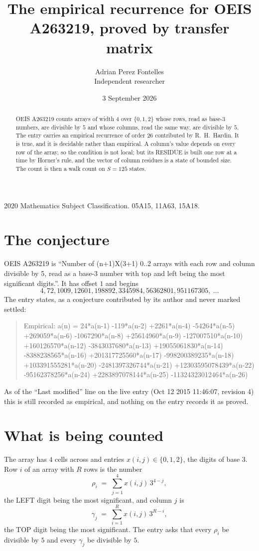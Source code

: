 \documentclass[11pt,a4paper]{article}
\title{The empirical recurrence for OEIS A263219, proved by transfer matrix}
\author{Adrian Perez Fontelles\\ \small Independent researcher}
\date{3 September 2026}
\theoremstyle{plain}
\theoremstyle{definition}
\begin{document}
\maketitle

\begin{abstract}
OEIS A263219 counts arrays of width $4$ over $\{0,1,2\}$ whose rows, read as base-$3$
numbers, are divisible by $5$ and whose columns, read the same way, are divisible by
$5$. The entry carries an empirical recurrence of order $26$ contributed by
R.~H.~Hardin. It is true, and it is decidable rather than empirical. A column's value depends on
every row of the array, so the condition is not local; but its RESIDUE is built one row at a
time by Horner's rule, and the vector of column residues is a state of bounded size. The count
is then a walk count on $S=125$ states.
\end{abstract}

\noindent\small 2020 Mathematics Subject Classification. 05A15, 11A63, 15A18.\normalsize

\section{The conjecture}

OEIS A263219 is ``Number of (n+1)X(3+1) 0..2 arrays with each row and column divisible by 5, read as a base-3 number with top and left being the most significant digits.''. It has offset $1$ and begins
\[
4, 72, 1009, 12601, 198892, 3345984, 56362801, 951167305,\ \dots
\]
The entry states, as a conjecture contributed by its author and never marked settled:
\begin{quote}
Empirical: a(n) = 24*a(n-1) -119*a(n-2) +2261*a(n-4) -54264*a(n-5) +269059*a(n-6) -1067290*a(n-8) +25614960*a(n-9) -127007510*a(n-10) +160126570*a(n-12) -3843037680*a(n-13) +19055061830*a(n-14) -8388238565*a(n-16) +201317725560*a(n-17) -998200389235*a(n-18) +103391555281*a(n-20) -2481397326744*a(n-21) +12303595078439*a(n-22) -95162378256*a(n-24) +2283897078144*a(n-25) -11324323012464*a(n-26)
\end{quote}
As of the ``Last modified'' line on the live entry (Oct 12 2015 11:46:07, revision 4) this is still
recorded as empirical, and nothing on the entry records it as proved.

\section{What is being counted}

The array has $4$ cells across and entries $x(i,j)\in\{0,1,2\}$, the digits of
base $3$. Row $i$ of an array with $R$ rows is the number
\[
\rho_i\;=\;\sum_{j=1}^{4}x(i,j)\,3^{4-j} ,
\]
the LEFT digit being the most significant, and column $j$ is
\[
\gamma_j\;=\;\sum_{i=1}^{R}x(i,j)\,3^{R-i} ,
\]
the TOP digit being the most significant. The entry asks that every $\rho_i$ be divisible by
$5$ and every $\gamma_j$ be divisible by $5$.
\end{document}
